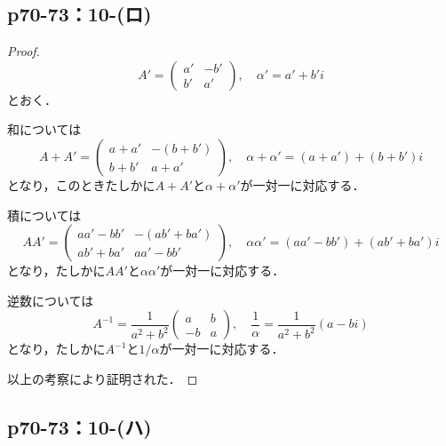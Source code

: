 \documentclass[a4paper,10pt,fleqn]{ltjsarticle}
\begin{document}
\newpage


\subsection*{p70-73：10-(ロ)}

\begin{tleftbar}
    \begin{proof}
        \[
            A' = \begin{pmatrix} a' & -b' \\ b' & a' \end{pmatrix} , \quad \alpha ' = a' + b' i
        \]
        とおく．

        和については
        \[
            A+A' = \begin{pmatrix} a+a' & -(b+b') \\ b+b' & a+a' \end{pmatrix} , \quad \alpha + \alpha ' = (a+a') + (b+b') i
        \]
        となり，このときたしかに$A+A'$と$\alpha + \alpha '$が一対一に対応する．

        積については
        \[
            A A' = \begin{pmatrix} a a' - b b' & - (a b' + b a') \\ a b' + b a' & a a' - b b' \end{pmatrix} , \quad \alpha \alpha ' = (a a' - b b') + (a b' + b a') i
        \]
        となり，たしかに$AA'$と$\alpha \alpha '$が一対一に対応する．

        逆数については
        \[
            A^{-1} = \frac{1}{a^2+b^2} \begin{pmatrix} a & b \\ -b & a \end{pmatrix},\quad \frac{1}{\alpha} = \frac{1}{a^2+b^2}(a -bi )
        \]
        となり，たしかに$A^{-1}$と$1/\alpha$が一対一に対応する．

        以上の考察により証明された．
    \end{proof}
\end{tleftbar}


\newpage

\subsection*{p70-73：10-(ハ)}
\end{document}
